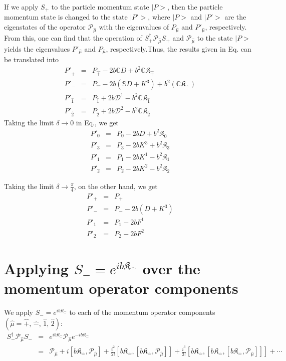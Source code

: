 \documentclass[]{article}
\numberwithin{equation}{section}
\def\bea{\begin{eqnarray}}
\def\eea{\end{eqnarray}}
\def\wh{\widehat}
\begin{document}
{{If we apply $S_+$ to the particle momentum state $|P>$, then the particle momentum state is changed to
the state $|P'>$, where $|P>$ and $|P'>$ are the eigenstates of the operator 
${\mathcal P}_{\wh{\mu}}$ with the eigenvalues of  $P_{\wh{\mu}}$ 
and $P'_{\wh{\mu}}$, respectively. From this, one can find that the operation of 
$S_+^{\dagger} {\mathcal P}_{\wh{\mu}}S_+$ and ${\mathcal P}_{\wh{\mu}}$ to the state $|P>$ yields the eigenvalues 
$P'_{\wh{\mu}}$ and $P_{\wh{\mu}}$, respectively.Thus, the results given in Eq. can be translated into
\bea
P'_{\wh+} & = & P_{\wh+}-2b\mathbb{C}D+{b^2}\mathbb{C}\mathfrak{K}_\hat{+}
\nonumber\\ 
P'_{\wh-} & = & P_{\wh-}-2b(\mathbb{S}D+K^3)+{b^2}(\mathbb{C}\mathfrak{K}_{\hat{-}})
\nonumber\\
P'_{\wh{1}} & = & {P}_{\wh{1}}+2b\mathcal{D}^1-b^2\mathbb{C}\mathfrak{K}_{\hat{1}} \nonumber\\
P'_{\wh{2}} & = & {P}_{\wh{2}}+2b\mathcal{D}^2-b^2\mathbb{C}\mathfrak{K}_{\hat{2}}
\eea
%
Taking the limit $\delta \rightarrow 0$ in Eq., we get
\bea
P'_{0} & = & P_{0}-2bD+{b^2}\mathfrak{K}_{0}
\nonumber\\ 
P'_{3} & = & P_{3}-2bK^3+{b^2}\mathfrak{K}_{3}
\nonumber\\
P'_{{1}} & = & {P}_{{1}}-2bK^1-b^2\mathfrak{K}_{{1}} \nonumber\\
P'_{{2}} & = & {P}_{{2}}-2bK^2-b^2\mathfrak{K}_{{2}}
\eea

Taking the limit $\delta \rightarrow \frac{\pi}{4}$, on the other hand, we get
\bea
P'_{+} & = & P_{+}
\nonumber\\ 
P'_{-} & = & P_{-}-2b(D+K^3)
\nonumber\\
P'_{{1}} & = & {P}_{{1}}-2bF^1 \nonumber\\
P'_{{2}} & = & {P}_{{2}}-2bF^2
\eea



\section{Applying $S_- =e^{ib\mathfrak{K}_{\hat{-}}}$ over the momentum operator components}

We apply $S_- =e^{ib\mathfrak{K}_{\hat{-}}}$ to each of the momentum operator components $(\wh{\mu} = \wh+,\,\wh- ,\, \wh1,\, \wh2)$:
\bea
S_-^{\dagger} {\mathcal P}_{\wh{\mu}}S_- & = & e^{ib\mathfrak{K}_{\hat{-}}} {\mathcal P}_{\wh{\mu}} e^{-ib\mathfrak{K}_{\hat{-}}} \nonumber \\
                                 & = & {\mathcal P}_{\wh{\mu}} + i\left[b\mathfrak{K}_{\hat{-}}, {\mathcal P}_{\wh{\mu}} \right] + \frac{i^2}{2!}\left[b\mathfrak{K}_{\hat{-}}, \left[b\mathfrak{K}_{\hat{-}}, {\mathcal P}_{\wh{\mu}} \right]\right] + \frac{i^3}{3!}\left[b\mathfrak{K}_{\hat{-}},\left[b\mathfrak{K}_{\hat{-}}, \left[b\mathfrak{K}_{\hat{-}}, {\mathcal P}_{\wh{\mu}} \right]\right]\right] + \cdots
\eea
% 

}}
\end{document}
